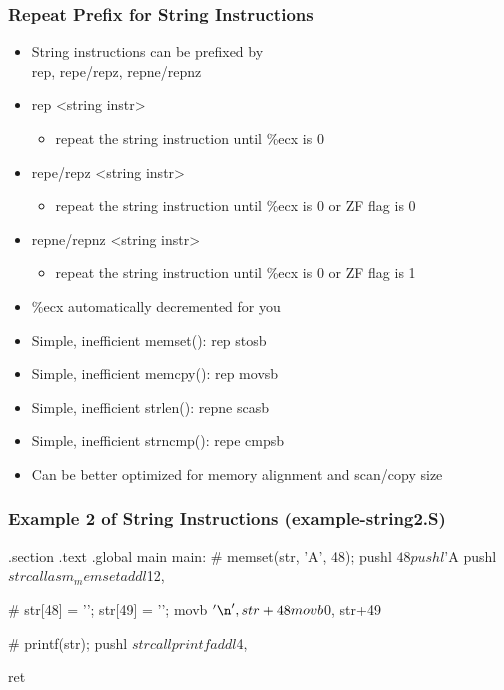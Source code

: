 \documentclass[11pt,xcolor=dvipsnames]{beamer}
\newcommand{\vs}{\vspace{0.5em}}
\newcommand{\mvs}{\vspace{-0.95em}}
\begin{document}
\begin{frame}[fragile,t]
\frametitle{Repeat Prefix for String Instructions}
\begin{itemize}
  \item String instructions can be prefixed by \\ {\ttfamily rep, repe/repz, repne/repnz}
  \item {\ttfamily rep <string instr>}
  \begin{itemize}
    \item repeat the string instruction until {\ttfamily \%ecx} is 0
  \end{itemize}
  \item {\ttfamily repe/repz <string instr>}
  \begin{itemize}
    \item repeat the string instruction until {\ttfamily \%ecx} is 0 or ZF flag is 0
  \end{itemize}
  \item {\ttfamily repne/repnz <string instr>}
  \begin{itemize}
    \item repeat the string instruction until {\ttfamily \%ecx} is 0 or ZF flag is 1
  \end{itemize}
  \item {\ttfamily \%ecx} automatically decremented for you
  \vs
  \pause
  \item Simple, inefficient {\ttfamily memset()}: {\ttfamily rep stosb}
  \item Simple, inefficient {\ttfamily memcpy()}: {\ttfamily rep movsb}
  \item Simple, inefficient {\ttfamily strlen()}: {\ttfamily repne scasb}
  \item Simple, inefficient {\ttfamily strncmp()}: {\ttfamily repe cmpsb}
  \item Can be better optimized for memory alignment and scan/copy size
\end{itemize}
\end{frame}

\begin{frame}[fragile,t]
\mvs
\frametitle{Example 2 of String Instructions (example-string2.S)}
\begin{gascode}
.section .text
.global main
main:
  # memset(str, 'A', 48);
  pushl $48
  pushl $'A
  pushl $str
  call asm_memset
  addl $12, %

  # str[48] = '\n'; str[49] = '\0';
  movb $'\n', str+48
  movb $0, str+49

  # printf(str);
  pushl $str
  call printf
  addl $4, %

  ret
\end{gascode}
\end{frame}
\end{document}
